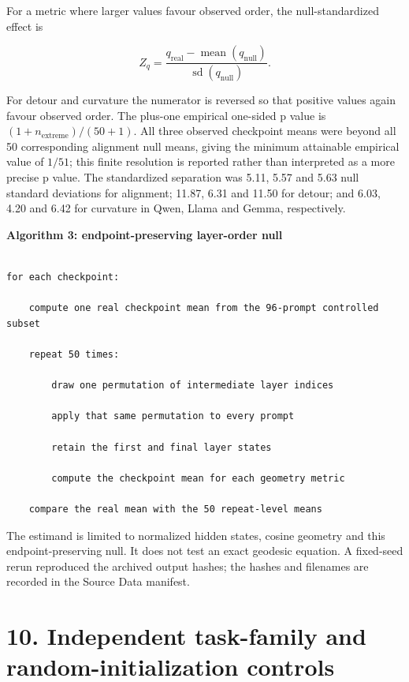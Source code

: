 \documentclass[10pt]{article}
\begin{document}
For a metric where larger values favour observed order, the null-standardized effect is

\begin{equation*}
Z_q=\frac{q_{\mathrm{real}}-\operatorname{mean}(q_{\mathrm{null}})}{\operatorname{sd}(q_{\mathrm{null}})}.
\end{equation*}

For detour and curvature the numerator is reversed so that positive values again favour observed order. The plus-one empirical one-sided p value is \((1+n_{\mathrm{extreme}})/(50+1)\). All three observed checkpoint means were beyond all 50 corresponding alignment null means, giving the minimum attainable empirical value of \(1/51\); this finite resolution is reported rather than interpreted as a more precise p value. The standardized separation was 5.11, 5.57 and 5.63 null standard deviations for alignment; 11.87, 6.31 and 11.50 for detour; and 6.03, 4.20 and 6.42 for curvature in Qwen, Llama and Gemma, respectively.

\textbf{Algorithm 3: endpoint-preserving layer-order null}

\begin{Verbatim}[fontsize=\small,breaklines=true,breakanywhere=true]

for each checkpoint:

    compute one real checkpoint mean from the 96-prompt controlled subset

    repeat 50 times:

        draw one permutation of intermediate layer indices

        apply that same permutation to every prompt

        retain the first and final layer states

        compute the checkpoint mean for each geometry metric

    compare the real mean with the 50 repeat-level means

\end{Verbatim}

The estimand is limited to normalized hidden states, cosine geometry and this endpoint-preserving null. It does not test an exact geodesic equation. A fixed-seed rerun reproduced the archived output hashes; the hashes and filenames are recorded in the Source Data manifest.

\section*{10. Independent task-family and random-initialization controls}
\end{document}
